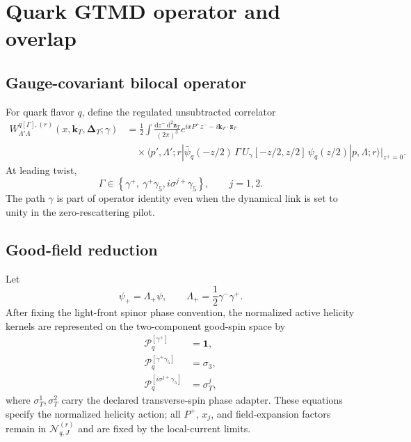 \documentclass[11pt]{article}
\newcommand{\kT}{\bm{k}_{T}}
\newcommand{\DT}{\bm{\Delta}_{T}}
\newcommand{\dd}{\mathrm{d}}
\newcommand{\cP}{\mathcal P}
\newcommand{\cN}{\mathcal N}
\newcommand{\bbone}{\bm 1}
\begin{document}
\section{Quark GTMD operator and overlap}
\label{sec:quark}

\subsection{Gauge-covariant bilocal operator}

For quark flavor \(q\), define the regulated unsubtracted correlator
\begin{align}
 W_{\Lambda'\Lambda}^{q[\Gamma],(r)}
 (x,\kT,\DT;\gamma)
 &=\frac12
 \int\frac{\dd z^-\,\dd^2\bm z_T}{(2\pi)^3}
 e^{ixP^+z^- -i\kT\cdot\bm z_T}
\nonumber\\
 &\quad\times
 \langle p',\Lambda';r|
 \bar\psi_q(-z/2)\,\Gamma\,
 U_\gamma[-z/2,z/2]\,
 \psi_q(z/2)
 |p,\Lambda;r\rangle
 \big|_{z^+=0}.
\label{eq:quark-gtmd-definition}
\end{align}
At leading twist,
\begin{equation}
 \Gamma\in
 \left\{\gamma^+,\ \gamma^+\gamma_5,
 i\sigma^{j+}\gamma_5\right\},
 \qquad j=1,2.
\label{eq:quark-leading-projectors}
\end{equation}
The path \(\gamma\) is part of operator identity even when the dynamical link
is set to unity in the zero-rescattering pilot.

\subsection{Good-field reduction}

Let
\begin{equation}
 \psi_+=\Lambda_+\psi,
 \qquad
 \Lambda_+=\frac12\gamma^-\gamma^+.
\label{eq:good-field-projector}
\end{equation}
After fixing the light-front spinor phase convention, the normalized active
helicity kernels are represented on the two-component good-spin space by
\begin{align}
 \cP_q^{[\gamma^+]}&=\bbone,
\label{eq:quark-unpol-kernel}\\
 \cP_q^{[\gamma^+\gamma_5]}&=\sigma_3,
\label{eq:quark-helicity-kernel}\\
 \cP_q^{[i\sigma^{j+}\gamma_5]}&=\sigma_T^j,
\label{eq:quark-transverse-kernel}
\end{align}
where \(\sigma_T^1,\sigma_T^2\) carry the declared transverse-spin phase
adapter.  These equations specify the normalized helicity action; all
\(P^+\), \(x_j\), and field-expansion factors remain in
\(\cN_{q,J}^{(r)}\) and are fixed by the local-current limits.
\end{document}
